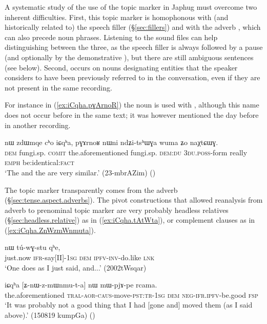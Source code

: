 A systematic study of the use of the topic marker  in Japhug must overcome two inherent difficulties. First, this topic marker is homophonous with (and historically related to) the speech filler  (§\ref{sec:fillers}) and with the adverb , which can also precede noun phrases. Listening to the sound files can help distinguishing between the three, as the speech filler is always followed by a pause (and optionally by the demonstrative ), but there are still ambiguous sentences (see below). Second,  occurs on nouns designating entities that the speaker considers to have been previously referred to in the conversation, even if they are not present in the same recording. 

For instance in (\ref{ex:iCqha.pɣArnoR}) the noun  is used with , although this name does not occur before in the same text; it was however mentioned the day before in another recording.

\begin{exe}
\ex \label{ex:iCqha.pɣArnoR}
\gll nɯ zdɯmqe cʰo iɕqʰa, pɣɤrnoʁ nɯni ndʑi-tsʰɯɣa wuma ʑo naχtɕɯɣ. \\
\textsc{dem} fungi.sp. \textsc{comit} the.aforementioned fungi.sp. \textsc{dem}:\textsc{du} \textsc{3du}.\textsc{poss}-form really \textsc{emph} be:identical:\textsc{fact} \\
\glt `The  and the  are very similar.' (23-mbrAZim)
()
\end{exe}

 
The topic marker  transparently comes from the adverb  (§\ref{sec:tense.aspect.adverbs}). The pivot constructions that allowed reanalysis from adverb to prenominal topic marker are very probably headless relatives (§\ref{sec:headless.relative}) as in  (\ref{ex:iCqha.tAtWta}), or complement clauses as in (\ref{ex:iCqha.ZnWzmWnmuta}). 

\begin{exe}
\ex \label{ex:iCqha.tAtWta}
  nɯ tú-wɣ-stu qʰe, \\
 just.now \textsc{ifr}-say[II]-\textsc{1sg} \textsc{dem} \textsc{ipfv}-\textsc{inv}-do.like \textsc{lnk} \\
\glt `One does as I just said, and...' (2002tWsqar)
\end{exe}

\begin{exe}
\ex \label{ex:iCqha.ZnWzmWnmuta}
 \gll iɕqʰa [ʑ-nɯ-z-mɯnmu-t-a] nɯ mɯ-pjɤ-pe rcama.  \\
the.aforementioned  \textsc{tral}-\textsc{aor}-\textsc{caus}-move-\textsc{pst}:\textsc{tr}-\textsc{1sg} \textsc{dem} \textsc{neg}-\textsc{ifr}.\textsc{ipfv}-be.good \textsc{fsp} \\
\glt `It was probably not a good thing that I had [gone and] moved them (as I said above).' (150819 kumpGa) ()
 \end{exe}
 
